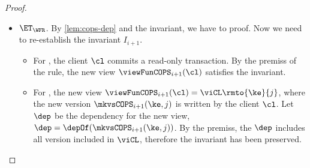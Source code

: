 \begin{proof}
\begin{itemize}
        \item \( \ET_\WFR \).
            By \cref{lem:cops-dep} and the invariant, we have to proof.
            Now we need to re-establish the invariant \( I_{i+1} \).
            \begin{itemize}
                \item 
                For , the client \( \cl \) commits a read-only transaction.
                By the premiss of the rule, the new view \( \viewFunCOPS_{i+1}(\cl) \) satisfies the invariant.
                \item For , the new view \( \viewFunCOPS_{i+1}(\cl) = \viCL\rmto{\ke}{j} \),
                where the new version \( \mkvsCOPS_{i+1}(\ke,j)\) is written by the client \( \cl \).
                Let \( \dep \) be the dependency for the new view, \ie \( \dep = \depOf(\mkvsCOPS_{i+1}(\ke,j)) \).
                By the premiss, the \( \dep \) includes all version included in \( \viCL \), 
                therefore the invariant has been preserved.
            \end{itemize}
    \end{itemize}
\end{proof}

